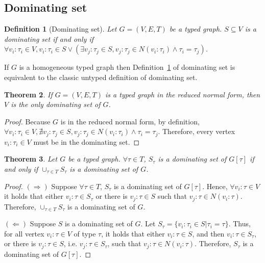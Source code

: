 \documentclass[preprint,12pt]{elsarticle}
\theoremstyle{plain}
\newtheorem{theorem}{Theorem}[section]
\newtheorem{definition}[theorem]{Definition}
\newcommand\tyv[2]{#1\!\!:\!\!#2}
\begin{document}
\subsection{Dominating set}

\begin{definition}[Dominating set]\label{def:dom-set}
Let $G = (V,E,T)$ be a typed graph.
$S\subseteq V$ is a dominating set
if and only if
$\forall \tyv{v_i}{\tau_i}\in V, \tyv{v_i}{\tau_i}\in S \vee
 (
   \exists \tyv{v_j}{\tau_j}\in S, \tyv{v_j}{\tau_j}\in N(\tyv{v_i}{\tau_i})
   \wedge \tau_i=\tau_j
 )
$.
\end{definition}

If $G$ is a homogeneous typed graph
then Definition~\ref{def:dom-set}
of dominating set is equivalent 
to the classic untyped definition
of dominating set.

\begin{theorem}
If $G = (V,E,T)$ is a typed graph in the reduced normal form,
then $V$ is the only dominating set of $G$.
\end{theorem}
\begin{proof}
Because $G$ is in the reduced normal form, by definition,
$\forall \tyv{v_i}{\tau_i}\in V,
\nexists \tyv{v_j}{\tau_j}\in S, \tyv{v_j}{\tau_j}\in N(\tyv{v_i}{\tau_i})
   \wedge \tau_i=\tau_j$.
Therefore, every vertex $\tyv{v_i}{\tau_i}\in V$ must be in the dominating set.
\end{proof}

\begin{theorem}
Let $G$ be a typed graph.
$\forall \tau \in T$, $S_\tau$ is a dominating set of $G[\tau]$
if and only if $\cup_{\tau\in T} S_\tau$ is a dominating set of $G$.
\end{theorem}
\begin{proof}
$(\Longrightarrow)$ Suppose  
$\forall \tau \in T$, $S_\tau$ is a dominating set of $G[\tau]$.
Hence, $\forall \tyv{v_i}{\tau}\in V$ it holds that 
either $\tyv{v_i}{\tau}\in S_{\tau}$ or there is 
$\tyv{v_j}{\tau}\in S$ such that $\tyv{v_j}{\tau}\in N(\tyv{v_i}{\tau})$.
Therefore, $\cup_{\tau\in T} S_\tau$ is a dominating set of $G$.

$(\Longleftarrow)$ Suppose $S$ is a dominating set of $G$.
Let $S_\tau = \{\tyv{v_i}{\tau_i}\in S|\tau_i=\tau\}$.
Thus, for all vertex $\tyv{v_i}{\tau}\in V$ of type $\tau$,
it holds that 
either $\tyv{v_i}{\tau}\in S$, and then $\tyv{v_i}{\tau}\in S_\tau$,
or there is 
$\tyv{v_j}{\tau}\in S$, i.e. $\tyv{v_j}{\tau}\in S_\tau$,
such that $\tyv{v_j}{\tau}\in N(\tyv{v_i}{\tau})$.
Therefore, $S_\tau$ is a dominating set of $G[\tau]$.
\end{proof}
\end{document}
